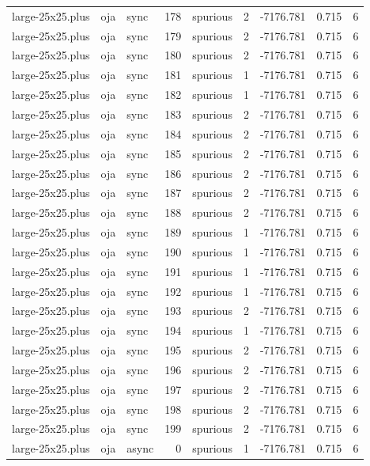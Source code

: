 \begin{tabular}{lllrlrrrr}
large-25x25.plus & oja & sync & 178 & spurious & 2 & -7176.781 & 0.715 & 6 \\
large-25x25.plus & oja & sync & 179 & spurious & 2 & -7176.781 & 0.715 & 6 \\
large-25x25.plus & oja & sync & 180 & spurious & 2 & -7176.781 & 0.715 & 6 \\
large-25x25.plus & oja & sync & 181 & spurious & 1 & -7176.781 & 0.715 & 6 \\
large-25x25.plus & oja & sync & 182 & spurious & 1 & -7176.781 & 0.715 & 6 \\
large-25x25.plus & oja & sync & 183 & spurious & 2 & -7176.781 & 0.715 & 6 \\
large-25x25.plus & oja & sync & 184 & spurious & 2 & -7176.781 & 0.715 & 6 \\
large-25x25.plus & oja & sync & 185 & spurious & 2 & -7176.781 & 0.715 & 6 \\
large-25x25.plus & oja & sync & 186 & spurious & 2 & -7176.781 & 0.715 & 6 \\
large-25x25.plus & oja & sync & 187 & spurious & 2 & -7176.781 & 0.715 & 6 \\
large-25x25.plus & oja & sync & 188 & spurious & 2 & -7176.781 & 0.715 & 6 \\
large-25x25.plus & oja & sync & 189 & spurious & 1 & -7176.781 & 0.715 & 6 \\
large-25x25.plus & oja & sync & 190 & spurious & 1 & -7176.781 & 0.715 & 6 \\
large-25x25.plus & oja & sync & 191 & spurious & 1 & -7176.781 & 0.715 & 6 \\
large-25x25.plus & oja & sync & 192 & spurious & 1 & -7176.781 & 0.715 & 6 \\
large-25x25.plus & oja & sync & 193 & spurious & 2 & -7176.781 & 0.715 & 6 \\
large-25x25.plus & oja & sync & 194 & spurious & 1 & -7176.781 & 0.715 & 6 \\
large-25x25.plus & oja & sync & 195 & spurious & 2 & -7176.781 & 0.715 & 6 \\
large-25x25.plus & oja & sync & 196 & spurious & 2 & -7176.781 & 0.715 & 6 \\
large-25x25.plus & oja & sync & 197 & spurious & 2 & -7176.781 & 0.715 & 6 \\
large-25x25.plus & oja & sync & 198 & spurious & 2 & -7176.781 & 0.715 & 6 \\
large-25x25.plus & oja & sync & 199 & spurious & 2 & -7176.781 & 0.715 & 6 \\
large-25x25.plus & oja & async & 0 & spurious & 1 & -7176.781 & 0.715 & 6 \\

\end{tabular}
